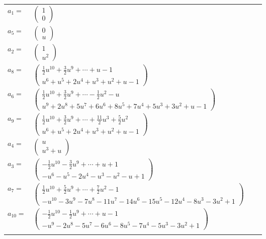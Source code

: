 \documentclass[1p]{elsarticle_modified}
\theoremstyle{definition}
\begin{document}
\begin{tabular}{m{7pt} m{180pt} m{7pt} m{180pt} }
\flushright $a_{1}=$&$\begin{pmatrix}1\\0\end{pmatrix}$ \\
\flushright $a_{5}=$&$\begin{pmatrix}0\\u\end{pmatrix}$ \\
\flushright $a_{2}=$&$\begin{pmatrix}1\\u^2\end{pmatrix}$ \\
\flushright $a_{8}=$&$\begin{pmatrix}\frac{1}{2} u^{10}+\frac{3}{2} u^9+\cdots+u-1\\u^6+u^5+2 u^4+u^3+u^2+u-1\end{pmatrix}$ \\
\flushright $a_{6}=$&$\begin{pmatrix}\frac{1}{2} u^{10}+\frac{3}{2} u^9+\cdots-\frac{1}{2} u^2- u\\u^9+2 u^8+5 u^7+6 u^6+8 u^5+7 u^4+5 u^3+3 u^2+u-1\end{pmatrix}$ \\
\flushright $a_{9}=$&$\begin{pmatrix}\frac{1}{2} u^{10}+\frac{3}{2} u^9+\cdots+\frac{11}{2} u^3+\frac{5}{2} u^2\\u^6+u^5+2 u^4+u^3+u^2+u-1\end{pmatrix}$ \\
\flushright $a_{4}=$&$\begin{pmatrix}u\\u^3+u\end{pmatrix}$ \\
\flushright $a_{3}=$&$\begin{pmatrix}-\frac{1}{2} u^{10}-\frac{3}{2} u^9+\cdots+u+1\\- u^6- u^5-2 u^4- u^3- u^2- u+1\end{pmatrix}$ \\
\flushright $a_{7}=$&$\begin{pmatrix}\frac{1}{2} u^{10}+\frac{5}{2} u^9+\cdots+\frac{7}{2} u^2-1\\- u^{10}-3 u^9-7 u^8-11 u^7-14 u^6-15 u^5-12 u^4-8 u^3-3 u^2+1\end{pmatrix}$ \\
\flushright $a_{10}=$&$\begin{pmatrix}-\frac{1}{2} u^{10}-\frac{1}{2} u^9+\cdots+u-1\\- u^9-2 u^8-5 u^7-6 u^6-8 u^5-7 u^4-5 u^3-3 u^2+1\end{pmatrix}$\\&\end{tabular}
\end{document}
